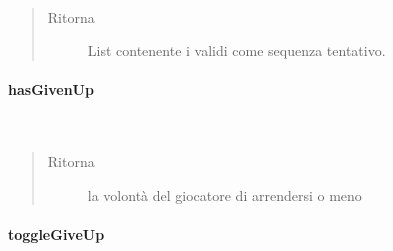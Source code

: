 \documentclass[letterpaper,10pt,italian,openany,oneside]{sphinxmanual}
\begin{document}
\begin{fulllineitems}
\label{\detokenize{source/it/unicam/cs/pa/mastermind/players/CodeBreaker:it.unicam.cs.pa.mastermind.players.CodeBreaker.getAttempt()}}~\begin{quote}\begin{description}
\item[{Ritorna}] \leavevmode
List contenente i  validi come sequenza tentativo.

\end{description}\end{quote}

\end{fulllineitems}



\paragraph{hasGivenUp}
\label{\detokenize{source/it/unicam/cs/pa/mastermind/players/CodeBreaker:hasgivenup}}

\begin{fulllineitems}
\label{\detokenize{source/it/unicam/cs/pa/mastermind/players/CodeBreaker:it.unicam.cs.pa.mastermind.players.CodeBreaker.hasGivenUp()}}~\begin{quote}\begin{description}
\item[{Ritorna}] \leavevmode
la volontà del giocatore  di arrendersi o meno

\end{description}\end{quote}

\end{fulllineitems}



\paragraph{toggleGiveUp}
\label{\detokenize{source/it/unicam/cs/pa/mastermind/players/CodeBreaker:togglegiveup}}
\end{document}
